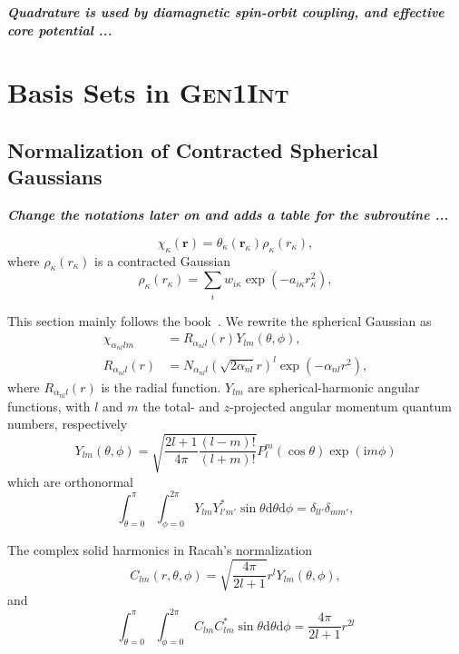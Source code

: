 \documentclass[a4paper,11pt,twoside,openright]{book}
\newcommand{\fixme}[1]{\textbf{\textit{\color{red} #1}}}
\begin{document}
\fixme{Quadrature is used by diamagnetic spin-orbit coupling, and effective core potential ...}

\section{Basis Sets in \textsc{Gen1Int}}
\label{sect:basis}

\subsection{Normalization of Contracted Spherical Gaussians}
\label{subsec:norm-sgto}

\fixme{Change the notations later on and adds a table for the subroutine ...}

\begin{equation}
  \chi_{\kappa}(\boldsymbol{r})=\theta_{\kappa}(\boldsymbol{r}_{\kappa})\rho_{\kappa}(r_{\kappa}),
\end{equation}
where $\rho_{\kappa}(r_{\kappa})$ is a contracted Gaussian
\begin{equation}
  \rho_{\kappa}(r_{\kappa})=\sum_{i}w_{i\kappa}\exp(-a_{i\kappa}r_{\kappa}^{2}),
\end{equation}

This section mainly follows the book~\cite{Helgaker:2000}. We rewrite the spherical Gaussian as
\begin{align}
  \chi_{\alpha_{nl}lm}&=R_{\alpha_{nl}l}(r)Y_{lm}(\theta,\phi),\\
  R_{\alpha_{nl}l}(r)&=N_{\alpha_{nl}l}(\sqrt{2\alpha_{nl}}r)^{l}\exp(-\alpha_{nl}r^2),
\end{align}
where $R_{\alpha_{nl}l}(r)$ is the radial function. $Y_{lm}$ are spherical-harmonic
angular functions, with $l$ and $m$ the total- and $z$-projected angular momentum quantum numbers,
respectively
\begin{equation}
    Y_{lm}(\theta,\phi)=\sqrt{\frac{2l+1}{4\pi}\frac{(l-m)!}{(l+m)!}}P_{l}^{m}(\cos{\theta})\exp(\text{i}m\phi)
\end{equation}
which are orthonormal
\begin{equation}
  \int_{\theta=0}^{\pi}\int_{\phi=0}^{2\pi}Y_{lm}Y_{l'm'}^{*}\sin{\theta}\mathrm{d}\theta\mathrm{d}\phi=\delta_{ll'}\delta_{mm'}, 
\end{equation}

The complex solid harmonics in Racah's normalization
\begin{equation}
    C_{lm}(r,\theta,\phi)=\sqrt{\frac{4\pi}{2l+1}}r^{l}Y_{lm}(\theta,\phi),
\end{equation}
and
\begin{equation}
    \int_{\theta=0}^{\pi}\int_{\phi=0}^{2\pi}C_{lm}C_{lm}^{*}\sin{\theta}\mathrm{d}\theta\mathrm{d}\phi=\frac{4\pi}{2l+1}r^{2l} 
\end{equation}
\end{document}
